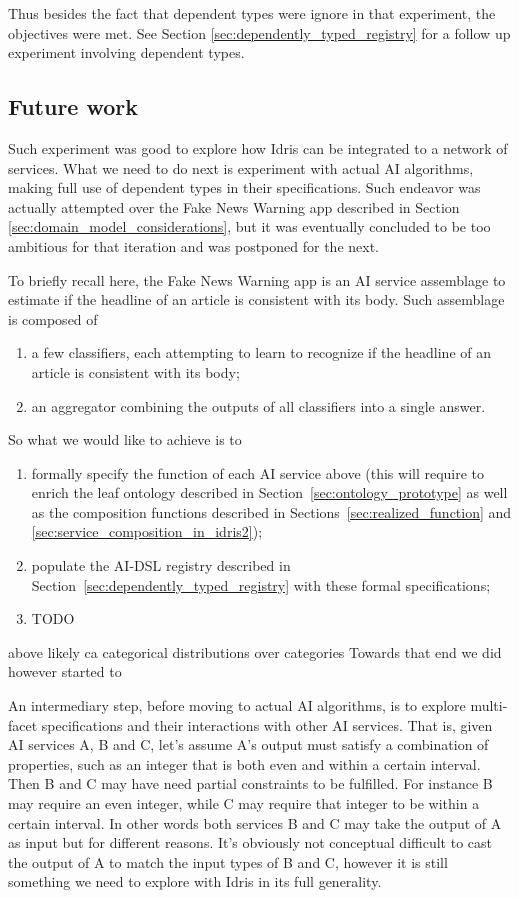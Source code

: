 \documentclass[]{report}
\begin{document}
Thus besides the fact that dependent types were ignore in that
experiment, the objectives were met.  See Section \ref{sec:dependently_typed_registry}
for a follow up experiment involving dependent types.

\subsection{Future work}
\label{sec:net_ai_future_work}
Such experiment was good to explore how Idris can be integrated to a
network of services.  What we need to do next is experiment with
actual AI algorithms, making full use of dependent types in their
specifications.  Such endeavor was actually attempted over the Fake
News Warning app described in Section
\ref{sec:domain_model_considerations}, but it was eventually concluded
to be too ambitious for that iteration and was postponed for the next.

To briefly recall here, the Fake News Warning app is an AI service
assemblage to estimate if the headline of an article is consistent
with its body.  Such assemblage is composed of
\begin{enumerate}
\item a few classifiers, each attempting to learn to recognize if the
  headline of an article is consistent with its body;
\item an aggregator combining the outputs of all classifiers into a
  single answer.
\end{enumerate}
So what we would like to achieve is to
\begin{enumerate}
\item formally specify the function of each AI service above (this
  will require to enrich the leaf ontology described in
  Section~\ref{sec:ontology_prototype} as well as the composition
  functions described in Sections~\ref{sec:realized_function} and
  \ref{sec:service_composition_in_idris2});
\item populate the AI-DSL registry described in
  Section~\ref{sec:dependently_typed_registry} with these formal
  specifications;
\item TODO
\end{enumerate}

 above likely ca categorical distributions over categories Towards
 that end we did however started to

An intermediary step, before moving to actual AI algorithms, is to
explore multi-facet specifications and their interactions with other
AI services.  That is, given AI services A, B and C, let's assume A's
output must satisfy a combination of properties, such as an integer
that is both even and within a certain interval.  Then B and C may
have need partial constraints to be fulfilled.  For instance B may
require an even integer, while C may require that integer to be within
a certain interval.  In other words both services B and C may take the
output of A as input but for different reasons.  It's obviously not
conceptual difficult to cast the output of A to match the input types
of B and C, however it is still something we need to explore with
Idris in its full generality.
\end{document}

